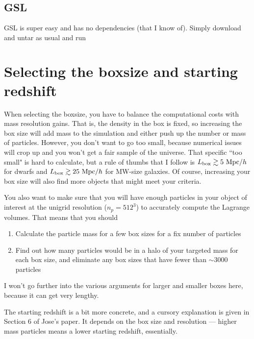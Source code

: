 \documentclass[10pt,a4paper,onecolumn]{article}
\newcommand{\hmpc}{\mathrm{Mpc}/h}
\begin{document}
\subsection{GSL}
GSL is super easy and has no dependencies (that I know of).  Simply download
and untar as usual and run

\section{Selecting the boxsize and starting redshift}
When selecting the boxsize, you have to balance the computational costs
with mass resolution gains.  That is, the density in the box is fixed, so increasing
the box size will add mass to the simulation and either push up the number
or mass of particles.  However, you don't want to go too small, because
numerical issues will crop up and you won't get a fair sample of the universe.
That specific ``too small" is hard to calculate, but a rule of thumbs that I follow is
$L_{\rm box} ~\hmpc$ for dwarfs and $L_{\rm box} ~\hmpc$
for MW-size galaxies.  Of course, increasing your box size will also find more objects
that might meet your criteria.

You also want to make sure that you will have enough particles in your object
of interest at the unigrid resolution ($n_p = 512^3$) to accurately compute the
Lagrange volumes.  That means that you should
\begin{enumerate}
\item Calculate the particle mass for a few box sizes for a fix number of particles
\item Find out how many particles would be in a halo of your targeted mass for 
each box size, and eliminate any box sizes that have fewer than $\sim3000$ particles
\end{enumerate}

I won't go further into the various arguments for larger and smaller boxes here, because it 
can get very lengthy.  

The starting redshift is a bit more concrete, and a cursory explanation is given in Section 
6 of Jose's paper.  It depends on the box size and resolution --- higher mass particles
means a lower starting redshift, essentially.
\end{document}
